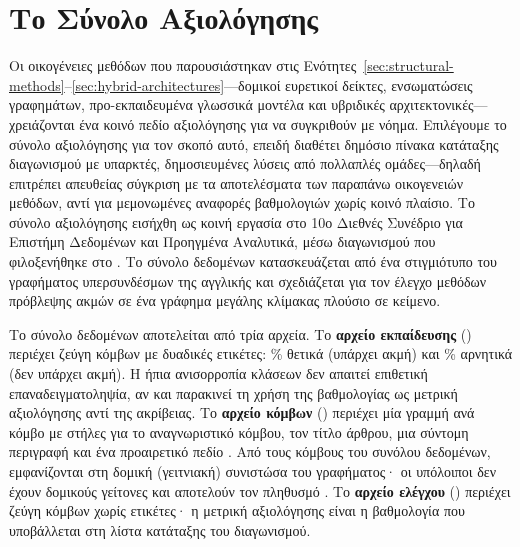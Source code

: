 \section{Το Σύνολο Αξιολόγησης }
\label{sec:dsaa-dataset}

Οι οικογένειες μεθόδων που παρουσιάστηκαν στις Ενότητες~\ref{sec:structural-methods}--\ref{sec:hybrid-architectures}---δομικοί ευρετικοί δείκτες, ενσωματώσεις γραφημάτων,
προ-εκπαιδευμένα γλωσσικά μοντέλα και υβριδικές αρχιτεκτονικές---χρειάζονται ένα
κοινό πεδίο αξιολόγησης για να συγκριθούν με νόημα.
Επιλέγουμε το σύνολο αξιολόγησης 
\cite{phan2023link,dsaa-2023-competition} για τον σκοπό αυτό, επειδή διαθέτει
δημόσιο πίνακα κατάταξης διαγωνισμού με υπαρκτές, δημοσιευμένες λύσεις από
πολλαπλές ομάδες---δηλαδή επιτρέπει απευθείας σύγκριση με τα αποτελέσματα των
παραπάνω οικογενειών μεθόδων, αντί για μεμονωμένες αναφορές βαθμολογιών χωρίς
κοινό πλαίσιο.
Το σύνολο αξιολόγησης εισήχθη ως κοινή εργασία στο 10ο Διεθνές
Συνέδριο  για Επιστήμη Δεδομένων και Προηγμένα Αναλυτικά, μέσω
διαγωνισμού που φιλοξενήθηκε στο .
Το σύνολο δεδομένων κατασκευάζεται από ένα στιγμιότυπο του γραφήματος
υπερσυνδέσμων της αγγλικής  και σχεδιάζεται για τον έλεγχο μεθόδων
πρόβλεψης ακμών σε ένα γράφημα μεγάλης κλίμακας πλούσιο σε κείμενο.

Το σύνολο δεδομένων αποτελείται από τρία αρχεία.
Το \textbf{αρχείο εκπαίδευσης}
(\texttt{}) περιέχει \TrainPairs{} ζεύγη κόμβων με δυαδικές ετικέτες: \TrainPosPct\%
θετικά (υπάρχει ακμή) και \TrainNegPct\% αρνητικά (δεν υπάρχει ακμή).
Η ήπια ανισορροπία
κλάσεων δεν απαιτεί επιθετική επαναδειγματοληψία, αν και παρακινεί τη χρήση της
βαθμολογίας  ως μετρική αξιολόγησης αντί της ακρίβειας.
Το \textbf{αρχείο
κόμβων} (\texttt{}) περιέχει μία γραμμή ανά κόμβο  με
στήλες για το αναγνωριστικό κόμβου, τον τίτλο άρθρου, μια σύντομη περιγραφή και ένα
προαιρετικό πεδίο .
Από τους \GraphNodesTotal{} κόμβους του συνόλου δεδομένων, \GraphNodes{}
εμφανίζονται στη δομική (γειτνιακή) συνιστώσα του γραφήματος· οι υπόλοιποι δεν έχουν
δομικούς γείτονες και αποτελούν τον πληθυσμό .
Το
\textbf{αρχείο ελέγχου} (\texttt{}) περιέχει \TestPairs{} ζεύγη κόμβων χωρίς
ετικέτες· η μετρική αξιολόγησης είναι η βαθμολογία  που υποβάλλεται
στη λίστα κατάταξης του διαγωνισμού.

